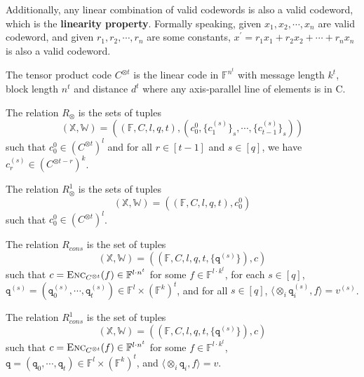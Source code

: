 Additionally, any linear combination of valid codewords is also a valid codeword, which is the \textbf{linearity property}. Formally speaking, given $x_1, x_2, \cdots, x_n$ are valid codeword, and given $r_1, r_2, \cdots, r_n$ are some constants, $x^\prime = r_1 x_1 + r_2 x_2 + \cdots + r_n x_n$ is also a valid codeword.

\begin{definition}
The tensor product code $C^{\otimes t}$ is the linear code in $\mathbb{F}^{n^t}$ with message length $k^t$, block length $n^t$ and distance $d^t$ where any axis-parallel line of elements is in C.
\end{definition}

\begin{definition}
The relation $R_\otimes$ is the sets of tuples
$$
    (\mathbb{X}, \mathbb{W}) = ((\mathbb{F}, C, l, q, t), (c_0^{0}, \{c_1^{(s)}\}_s, \cdots, \{c_{t-1}^{(s)}\}_s))
$$ 
such that $c_0^{0} \in (C^{\otimes t})^l$ and for all $r \in [t-1]$ and $s \in [q]$, we have $c_r^{(s)} \in (C^{\otimes t-r})^k$.
\end{definition}

\begin{definition}
\label{def:relation-prox}
The relation $R_\otimes^1$ is the sets of tuples
$$
    (\mathbb{X}, \mathbb{W}) = ((\mathbb{F}, C, l, q, t), c_0^{0})
$$ 
such that $c_0^{0} \in (C^{\otimes t})^l$.
\end{definition}

\begin{definition}
The relation $R_{cons}$ is the set of tuples
$$
    (\mathbb{X}, \mathbb{W}) = ((\mathbb{F}, C, l, q, t, \{\texttt{q}^{(s)}\}), c)
$$ 
such that $c = \textsc{Enc}_{C^{\otimes t}}(f) \in \mathbb{F}^{l\cdot n^t}$ for some $f \in \mathbb{F}^{l\cdot k^t}$, 
for each $s \in [q]$, $\texttt{q}^{(s)} = (\texttt{q}_0^{(s)}, \cdots, \texttt{q}_t^{(s)}) \in \mathbb{F}^{l} \times (\mathbb{F}^k)^t$, 
and for all $s \in [q]$, $\langle \otimes_{i}\texttt{q}_i^{(s)} , f \rangle = v^{(s)}$.

\end{definition}

\begin{definition}
\label{def:relation-cons}
The relation $R_{cons}^1$ is the set of tuples
$$
    (\mathbb{X}, \mathbb{W}) = ((\mathbb{F}, C, l, q, t, \{\texttt{q}^{(s)}\}), c)
$$ 
such that $c = \textsc{Enc}_{C^{\otimes t}}(f) \in \mathbb{F}^{l\cdot n^t}$ for some $f \in \mathbb{F}^{l\cdot k^t}$, 
$\texttt{q} = (\texttt{q}_0, \cdots, \texttt{q}_t) \in \mathbb{F}^{l} \times (\mathbb{F}^k)^t$, 
and $\langle \otimes_{i}\texttt{q}_i , f \rangle = v$.

\end{definition}

